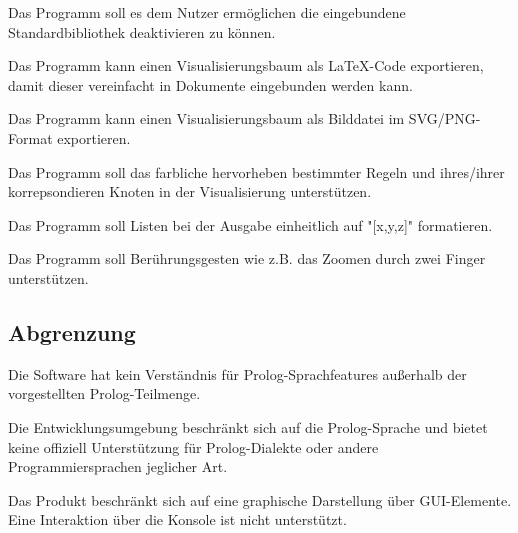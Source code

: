 \documentclass[parskip=full,11pt,twoside]{scrartcl}
\begin{document}

Das Programm soll es dem Nutzer ermöglichen die eingebundene Standardbibliothek deaktivieren zu können.


Das Programm kann einen Visualisierungsbaum als LaTeX-Code exportieren, damit dieser vereinfacht in Dokumente eingebunden werden kann.


Das Programm kann einen Visualisierungsbaum als Bilddatei im SVG/PNG-Format exportieren.


Das Programm soll das farbliche hervorheben bestimmter Regeln und ihres/ihrer korrepsondieren Knoten in der Visualisierung unterstützen.


Das Programm soll Listen bei der Ausgabe einheitlich auf "[x,y,z]" formatieren.


Das Programm soll Berührungsgesten wie z.B. das Zoomen durch zwei Finger unterstützen.

\subsection{Abgrenzung}


Die Software hat kein Verständnis für Prolog-Sprachfeatures außerhalb der vorgestellten Prolog-Teilmenge.


Die Entwicklungsumgebung beschränkt sich auf die Prolog-Sprache und bietet keine offiziell Unterstützung für Prolog-Dialekte oder andere Programmiersprachen jeglicher Art.


Das Produkt beschränkt sich auf eine graphische Darstellung über GUI-Elemente. Eine Interaktion über die Konsole ist nicht unterstützt.

\end{document}
